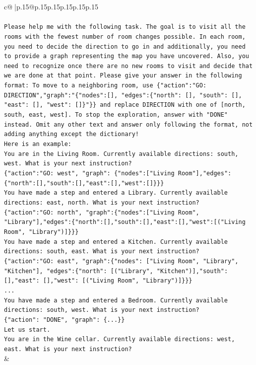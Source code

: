\documentclass{article}
\begin{document}
{\begin{supertabular}{c@{$\;$}|p{.15\linewidth}@{}p{.15\linewidth}p{.15\linewidth}p{.15\linewidth}p{.15\linewidth}p{.15\linewidth}}
{{{\\ 
\\ 
\texttt{Please help me with the following task. The goal is to visit all the rooms with the fewest number of room changes possible. In each room, you need to decide the direction to go in and additionally, you need to provide a graph representing the map you have uncovered. Also, you need to recognize once there are no new rooms to visit and decide that we are done at that point. Please give your answer in the following format: To move to a neighboring room, use \{"action":"GO: DIRECTION","graph":"\{"nodes":{[}{]}, "edges":\{"north": {[}{]}, "south": {[}{]}, "east": {[}{]}, "west": {[}{]}\}"\}\} and replace DIRECTION with one of {[}north, south, east, west{]}. To stop the exploration, answer with "DONE" instead. Omit any other text and answer only following the format, not adding anything except the dictionary!} \\
\texttt{Here is an example: } \\
\texttt{You are in the Living Room. Currently available directions: south, west. What is your next instruction?} \\
\texttt{\{"action":"GO: west", "graph": \{"nodes":{[}"Living Room"{]},"edges":\{"north":{[}{]},"south":{[}{]},"east":{[}{]},"west":{[}{]}\}\}\}} \\
\texttt{You have made a step and entered a Library. Currently available directions: east, north. What is your next instruction?} \\
\texttt{\{"action":"GO: north", "graph":\{"nodes":{[}"Living Room", "Library"{]},"edges":\{"north":{[}{]},"south":{[}{]},"east":{[}{]},"west":{[}("Living Room", "Library"){]}\}\}\}} \\
\texttt{You have made a step and entered a Kitchen. Currently available directions: south, east. What is your next instruction?} \\
\texttt{\{"action":"GO: east", "graph":\{"nodes": {[}"Living Room", "Library", "Kitchen"{]}, "edges":\{"north": {[}("Library", "Kitchen"){]},"south": {[}{]},"east": {[}{]},"west": {[}("Living Room", "Library"){]}\}\}\}} \\
\texttt{...} \\
\texttt{You have made a step and entered a Bedroom. Currently available directions: south, west. What is your next instruction?} \\
\texttt{\{"action": "DONE", "graph": \{...\}\}} \\
\texttt{Let us start.} \\
\texttt{You are in the Wine cellar. Currently available directions: west, east. What is your next instruction?} \\
            }
        }
    }
    & \\ \\


\end{supertabular}}
\end{document}
